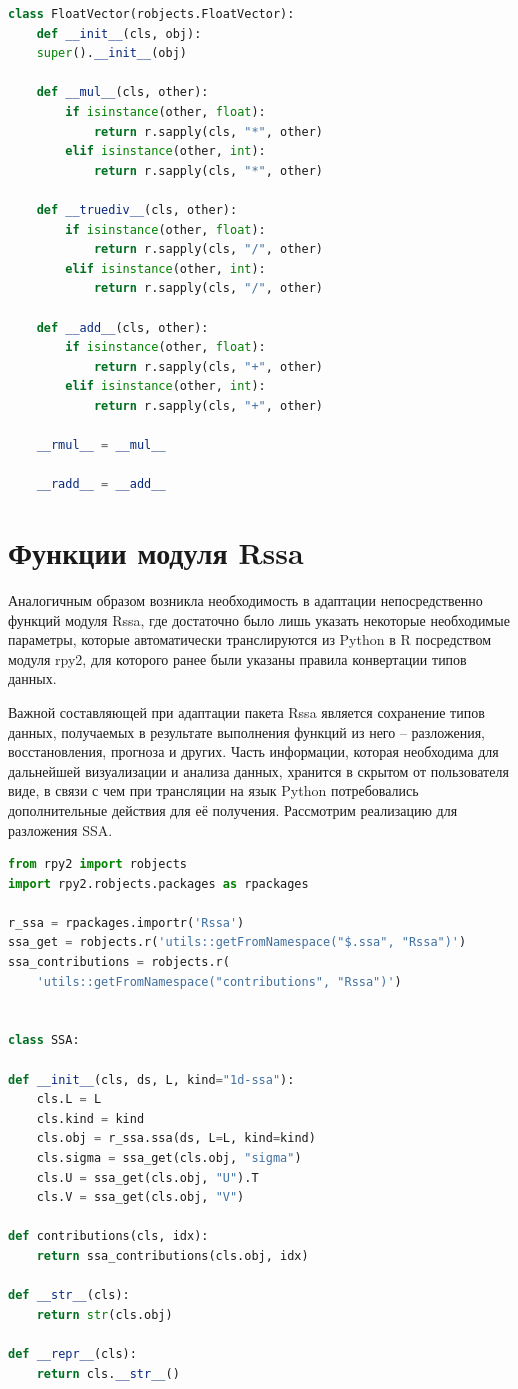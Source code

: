\documentclass[specialist,
			   substylefile = spbu_report.rtx,
			   subf,href,colorlinks=true, 12pt]{disser}
\begin{document}
\begin{lstlisting}[language=Python, caption=Наследование для FloatVector.]
class FloatVector(robjects.FloatVector):
	def __init__(cls, obj):
	super().__init__(obj)
	
	def __mul__(cls, other):
		if isinstance(other, float):
			return r.sapply(cls, "*", other)
		elif isinstance(other, int):
			return r.sapply(cls, "*", other)
	
	def __truediv__(cls, other):
		if isinstance(other, float):
			return r.sapply(cls, "/", other)
		elif isinstance(other, int):
			return r.sapply(cls, "/", other)
	
	def __add__(cls, other):
		if isinstance(other, float):
			return r.sapply(cls, "+", other)
		elif isinstance(other, int):
			return r.sapply(cls, "+", other)
	
	__rmul__ = __mul__
	
	__radd__ = __add__	
\end{lstlisting}

\section{Функции модуля Rssa}

Аналогичным образом возникла необходимость в адаптации непосредственно функций модуля Rssa, где достаточно было лишь указать некоторые необходимые параметры, которые автоматически транслируются из Python в R посредством модуля rpy2, для которого ранее были указаны правила конвертации типов данных. 

Важной составляющей при адаптации пакета Rssa является сохранение типов данных, получаемых в результате выполнения функций из него – разложения, восстановления, прогноза и других. Часть информации, которая необходима для дальнейшей визуализации и анализа данных, хранится в скрытом от пользователя виде, в связи с чем при трансляции на язык Python потребовались дополнительные действия для её получения. Рассмотрим реализацию для разложения SSA.

\begin{lstlisting}[language=Python, caption=Реализация типа данных SSA в Python.]
from rpy2 import robjects
import rpy2.robjects.packages as rpackages

r_ssa = rpackages.importr('Rssa')
ssa_get = robjects.r('utils::getFromNamespace("$.ssa", "Rssa")')
ssa_contributions = robjects.r(
	'utils::getFromNamespace("contributions", "Rssa")')


class SSA:

def __init__(cls, ds, L, kind="1d-ssa"):
	cls.L = L
	cls.kind = kind
	cls.obj = r_ssa.ssa(ds, L=L, kind=kind)
	cls.sigma = ssa_get(cls.obj, "sigma")
	cls.U = ssa_get(cls.obj, "U").T
	cls.V = ssa_get(cls.obj, "V")

def contributions(cls, idx):
	return ssa_contributions(cls.obj, idx)

def __str__(cls):
	return str(cls.obj)

def __repr__(cls):
	return cls.__str__()
\end{lstlisting}
\end{document}

